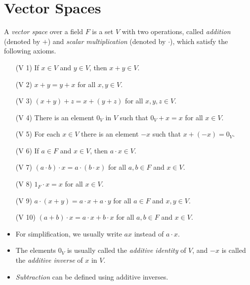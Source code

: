 \section{Vector Spaces}
\begin{definition}\label{def:vector-space}
  A \emph{vector space} over a field $F$ is a set $V$ with two operations,
  called \emph{addition} (denoted by $+$) and \emph{scalar multiplication}
  (denoted by $\cdot$), which satisfy the following axioms.
  \begin{enumerate}[leftmargin=3.5em]
    \item[(V 1)] If $x \in V$ and $y \in V$, then $x + y \in V$.
    \item[(V 2)] $x + y = y + x$ for all $x, y \in V$. 
    \item[(V 3)] $(x + y) + z = x + (y + z)$ for all $x, y, z \in V$.
    \item[(V 4)] There is an element $0_V$ in $V$ such that $0_V + x = x$ for
      all $x \in V$.
    \item[(V 5)] For each $x \in V$ there is an element $-x$ such that
      $x + (-x) = 0_V$.
    \item[(V 6)] If $a \in F$ and $x \in V$, then $a \cdot x \in V$. 
    \item[(V 7)] $(a \cdot b) \cdot x = a \cdot (b \cdot x)$ for all
      $a, b \in F$ and $x \in V$. 
    \item[(V 8)] $1_F \cdot x = x$ for all $x \in V$.
    \item[(V 9)] $a \cdot (x + y) = a \cdot x + a \cdot y$ for all $a \in F$
      and $x, y \in V$.
    \item[(V 10)] $(a + b) \cdot x = a \cdot x + b \cdot x$ for all
      $a, b \in F$ and $x \in V$.
  \end{enumerate}
\end{definition}

\begin{remark} \leavevmode
  \begin{itemize}
    \item For simplification, we usually write $ax$ instead of $a \cdot x$.
    \item The elements $0_V$ is usually called the \emph{additive identity} of
      $V$, and $-x$ is called the \emph{additive inverse} of $x$ in $V$.
    \item \emph{Subtraction} can be defined using additive inverses.
  \end{itemize}
\end{remark}

